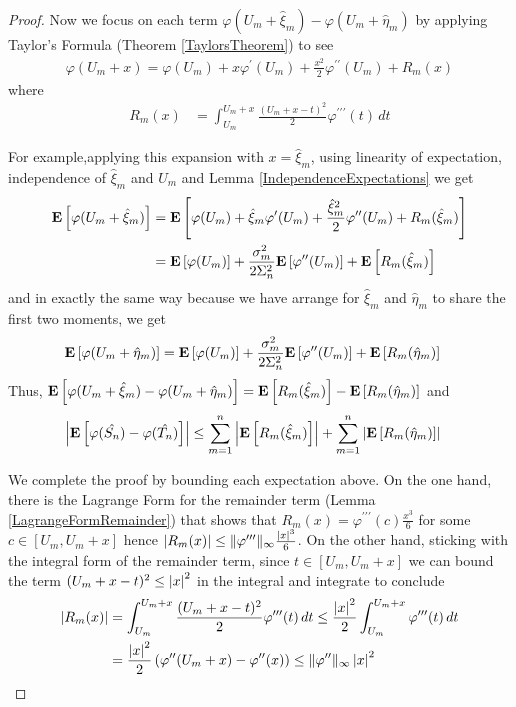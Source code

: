 \documentclass{amsart}
\theoremstyle{remark}
\theoremstyle{definition}
\begin{document}
\begin{proof}
Now we focus on each term $\varphi(U_m + \hat{\xi}_m) -\varphi(U_m +
\hat{\eta}_m)$ by applying Taylor's Formula (Theorem
\ref{TaylorsTheorem}) to see 
\begin{align*}
\varphi(U_m + x) = \varphi(U_m) + x \varphi^\prime(U_m) +
\frac{x^2}{2} \varphi^{\prime\prime}(U_m) + R_m(x)
\end{align*}
where
\begin{align*}
R_m(x) &=  \int_{U_m}^{U_m+x}
\frac{(U_m + x - t)^2}{2} \varphi^{\prime \prime \prime}(t) \, dt
\end{align*}

For example,applying this expansion with $x = \hat{\xi}_m$, using
linearity of expectation, independence of
$\hat{\xi}_m$ and $U_m$ and Lemma \ref{IndependenceExpectations} we get
\begin{align*}
\textbf{E}\left[\varphi(U_m + \hat{\xi}_m) \right] &= \textbf{E}\left[
  \varphi(U_m)+ \hat{\xi}_m \varphi^\prime(U_m) +
\frac{\hat{\xi}_m^2}{2} \varphi^{\prime\prime}(U_m) +
R_m(\hat{\xi}_m)\right] \\
&=\textbf{E}\left[
  \varphi(U_m)\right] + \frac{\sigma_m^2}{2\Sigma_n^2}\textbf{E}\left[\varphi^{\prime\prime}(U_m)\right] + \textbf{E}\left[R_m(\hat{\xi}_m)\right]
\end{align*}
and in exactly the same way because we have arrange for $\hat{\xi}_m$
and $\hat{\eta}_m$ to share the first two moments, we get
\begin{align*}
\textbf{E}\left[\varphi(U_m + \hat{\eta}_m) \right] &=\textbf{E}\left[
  \varphi(U_m)\right] + \frac{\sigma_m^2}{2\Sigma_n^2}\textbf{E}\left[\varphi^{\prime\prime}(U_m)\right] + \textbf{E}\left[R_m(\hat{\eta}_m)\right]
\end{align*}
Thus, $\textbf{E}\left[\varphi(U_m + \hat{\xi}_m)
  -\varphi(U_m + \hat{\eta}_m)\right] = \textbf{E}\left[R_m(\hat{\xi}_m)\right] -
\textbf{E}\left[R_m(\hat{\eta}_m)\right]$ and 
\begin{align*}
\left \vert \textbf{E}\left[\varphi(\hat{S_n}) - \varphi(\hat{T_n})\right] \right \vert &\leq 
\sum_{m=1}^n \left \vert \textbf{E}\left[R_m(\hat{\xi}_m) \right] \right \vert +  \sum_{m=1}^n \left \vert \textbf{E}\left[R_m(\hat{\eta}_m) \right] \right \vert
\end{align*}

We complete the proof by bounding each expectation above.  On the one hand, there is the Lagrange Form for the
remainder term (Lemma \ref{LagrangeFormRemainder}) that shows that $R_m(x) =
\varphi^{\prime\prime\prime}(c) \frac{x^3}{6}$ for some $c \in [U_m,
U_m+x]$ hence $\left \vert R_m(x) \right \vert \leq
\lVert \varphi^{\prime\prime\prime} \rVert_\infty \frac{\left \vert x \right \vert^3}{6}$. On
the other hand, sticking with the integral form of the remainder term, since $t \in [U_m, U_m + x]$ we can bound the term $(U_m + x - t)^2 \leq \left \vert x \right \vert^2$ in
the integral and integrate to conclude 
\begin{align*}
\left \vert R_m(x) \right \vert &=  \int_{U_m}^{U_m+x}
\frac{(U_m + x - t)^2}{2} \varphi^{\prime \prime \prime}(t) \, dt \leq
\frac{\left \vert x \right \vert^2}{2} \int_{U_m}^{U_m+x}
\varphi^{\prime \prime \prime}(t) \, dt \\
&=\frac{\left \vert x \right \vert^2}{2} \left(\varphi^{\prime \prime}(U_m+x) - \varphi^{\prime \prime}(x)\right) \leq \lVert \varphi^{\prime\prime} \rVert_\infty \left \vert x \right \vert^2
\end{align*}


\end{proof}
\end{document}
